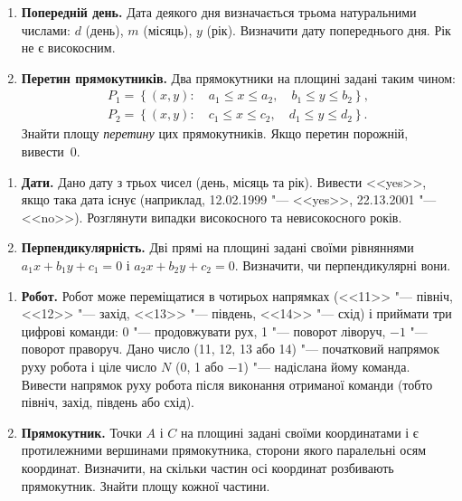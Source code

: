 	{\large
		\begin{enumerate}
			\item \textbf{Попередній день.} Дата деякого дня визначається трьома натуральними числами: $d$ (день), $m$ (місяць), $y$ (рік). Визначити дату попереднього дня. Рік не є високосним.
			\item \textbf{Перетин прямокутників.} Два прямокутники на площині задані таким чином:
			$$
			\begin{array}{c}
				P_1 = \left\{(x, y):\quad a_1\leqslant x\leqslant a_2,\quad b_1\leqslant y\leqslant b_2\right\},\\ 
				P_2 = \left\{(x, y):\quad c_1\leqslant x\leqslant c_2,\quad d_1\leqslant y\leqslant d_2\right\}.
			\end{array}
			$$
			Знайти площу {\itshape перетину} цих прямокутників. Якщо перетин порожній, вивести~0.
			
		\end{enumerate}
	}
	
	\vspace{1cm}
	
	
	{\large
		\begin{enumerate}
			\item \textbf{Дати.} Дано дату з трьох чисел (день, місяць та рік). Вивести <<yes>>, якщо така дата існує (наприклад, 12.02.1999 "--- <<yes>>, 22.13.2001 "--- <<no>>). Розглянути випадки високосного та невисокосного років.
			\item \textbf{Перпендикулярність.} Дві прямі на площині задані своїми рівняннями $a_1 x+b_1 y +c_1=0$ і $a_2 x+b_2 y +c_2=0$. Визначити, чи перпендикулярні вони.
		\end{enumerate}
	}
	
	
	\vspace{1cm}
	
	{\large
		\begin{enumerate}
			\item \textbf{Робот.} Робот може переміщатися в чотирьох напрямках (<<11>> "--- північ, <<12>> "--- захід, <<13>> "--- південь, <<14>> "--- схід) і приймати три цифрові команди: 0 "--- продовжувати рух, 1 "--- поворот ліворуч, $-1$ "--- поворот праворуч. Дано число (11, 12, 13 або 14) "--- початковий напрямок руху робота і ціле число $N$ (0, 1 або $-1$) "--- надіслана йому команда. Вивести напрямок руху робота після виконання отриманої команди (тобто північ, захід, південь або схід).
			\item \textbf{Прямокутник.} Точки $A$ і $C$ на площині задані своїми координатами і є про\-ти\-леж\-ни\-ми вершинами прямокутника, сторони якого паралельні осям координат. Визначити, на скільки частин осі координат розбивають прямокутник. Знайти площу кожної частини.
		\end{enumerate}
	}
	
